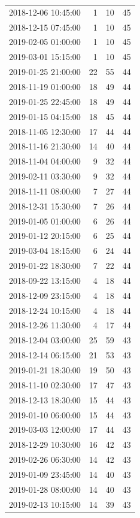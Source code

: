 \begin{tabular}{lrrr}
2018-12-06 10:45:00 & 1 & 10 & 45 \\
2018-12-15 07:45:00 & 1 & 10 & 45 \\
2019-02-05 01:00:00 & 1 & 10 & 45 \\
2019-03-01 15:15:00 & 1 & 10 & 45 \\
2019-01-25 21:00:00 & 22 & 55 & 44 \\
2018-11-19 01:00:00 & 18 & 49 & 44 \\
2019-01-25 22:45:00 & 18 & 49 & 44 \\
2019-01-15 04:15:00 & 18 & 45 & 44 \\
2018-11-05 12:30:00 & 17 & 44 & 44 \\
2018-11-16 21:30:00 & 14 & 40 & 44 \\
2018-11-04 04:00:00 & 9 & 32 & 44 \\
2019-02-11 03:30:00 & 9 & 32 & 44 \\
2018-11-11 08:00:00 & 7 & 27 & 44 \\
2018-12-31 15:30:00 & 7 & 26 & 44 \\
2019-01-05 01:00:00 & 6 & 26 & 44 \\
2019-01-12 20:15:00 & 6 & 25 & 44 \\
2019-03-04 18:15:00 & 6 & 24 & 44 \\
2019-01-22 18:30:00 & 7 & 22 & 44 \\
2018-09-22 13:15:00 & 4 & 18 & 44 \\
2018-12-09 23:15:00 & 4 & 18 & 44 \\
2018-12-24 10:15:00 & 4 & 18 & 44 \\
2018-12-26 11:30:00 & 4 & 17 & 44 \\
2018-12-04 03:00:00 & 25 & 59 & 43 \\
2018-12-14 06:15:00 & 21 & 53 & 43 \\
2019-01-21 18:30:00 & 19 & 50 & 43 \\
2018-11-10 02:30:00 & 17 & 47 & 43 \\
2018-12-13 18:30:00 & 15 & 44 & 43 \\
2019-01-10 06:00:00 & 15 & 44 & 43 \\
2019-03-03 12:00:00 & 17 & 44 & 43 \\
2018-12-29 10:30:00 & 16 & 42 & 43 \\
2019-02-26 06:30:00 & 14 & 42 & 43 \\
2019-01-09 23:45:00 & 14 & 40 & 43 \\
2019-01-28 08:00:00 & 14 & 40 & 43 \\
2019-02-13 10:15:00 & 14 & 39 & 43 \\

\end{tabular}
